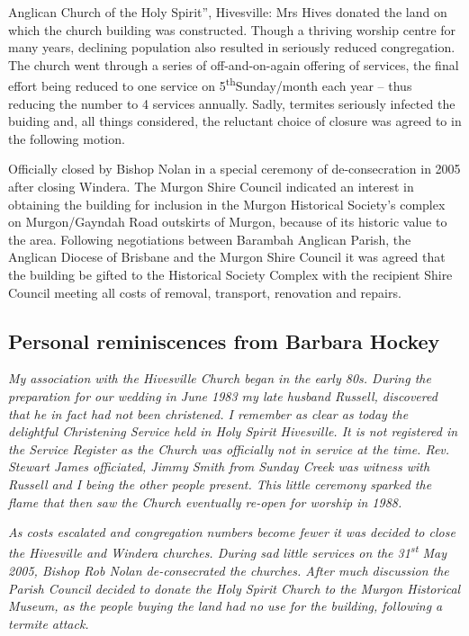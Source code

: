 Anglican Church of the Holy Spirit'', Hivesville: Mrs Hives donated the land on which the church building was constructed. Though a thriving worship centre for many years, declining population also resulted in seriously reduced congregation. The church went through a series of off-and-on-again offering of services, the final effort being reduced to one service on 5\textsuperscript{th}Sunday/month each year -- thus reducing the number to 4 services annually. Sadly, termites seriously infected the buiding and, all things considered, the reluctant choice of closure was agreed to in the following motion.

Officially closed by Bishop Nolan in a special ceremony of de-consecration in 2005 after closing Windera. The Murgon Shire Council indicated an interest in obtaining the building for inclusion in the Murgon Historical Society's complex on Murgon/Gayndah Road outskirts of Murgon, because of its historic value to the area. Following negotiations between Barambah Anglican Parish, the Anglican Diocese of Brisbane and the Murgon Shire Council it was agreed that the building be gifted to the Historical Society Complex with the recipient Shire Council meeting all costs of removal, transport, renovation and repairs.

\hypertarget{personal-reminiscences-from-barbara-hockey}{%
\subsection{Personal reminiscences from Barbara Hockey}\label{personal-reminiscences-from-barbara-hockey}}

\emph{My association with the Hivesville Church began in the early 80s. During the preparation for our wedding in June 1983 my late husband Russell, discovered that he in fact had not been christened. I remember as clear as today the delightful Christening Service held in Holy Spirit Hivesville. It is not registered in the Service Register as the Church was officially not in service at the time. Rev. Stewart James officiated, Jimmy Smith from Sunday Creek was witness with Russell and I being the other people present. This little ceremony sparked the flame that then saw the Church eventually re-open for worship in 1988.}

\emph{As costs escalated and congregation numbers become fewer it was decided to close the Hivesville and Windera churches. During sad little services on the 31\textsuperscript{st} May 2005, Bishop Rob Nolan de-consecrated the churches. After much discussion the Parish Council decided to donate the Holy Spirit Church to the Murgon Historical Museum, as the people buying the land had no use for the building, following a termite attack.}

